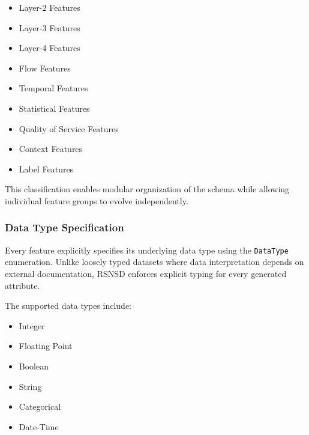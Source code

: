 \documentclass[12pt,a4paper]{article}
\begin{document}
\begin{itemize}
	
	\item Layer-2 Features
	
	\item Layer-3 Features
	
	\item Layer-4 Features
	
	\item Flow Features
	
	\item Temporal Features
	
	\item Statistical Features
	
	\item Quality of Service Features
	
	\item Context Features
	
	\item Label Features
	
\end{itemize}

This classification enables modular organization of the schema while allowing individual feature groups to evolve independently.

\subsubsection{Data Type Specification}

Every feature explicitly specifies its underlying data type using the \texttt{DataType} enumeration. Unlike loosely typed datasets where data interpretation depends on external documentation, RSNSD enforces explicit typing for every generated attribute.

The supported data types include:

\begin{itemize}
	
	\item Integer
	
	\item Floating Point
	
	\item Boolean
	
	\item String
	
	\item Categorical
	
	\item Date-Time
	
\end{itemize}
\end{document}
